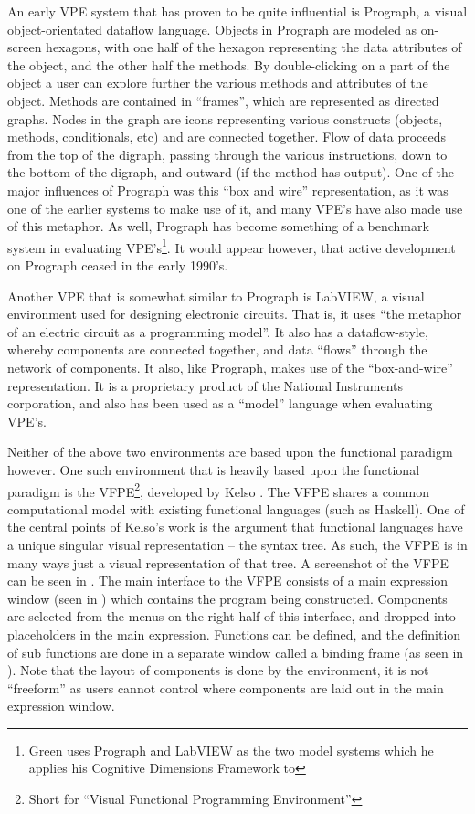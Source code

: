 An early VPE system that has proven to be quite influential is Prograph, a visual object-orientated dataflow language.  Objects in Prograph are modeled as on-screen hexagons, with one half of the hexagon representing the data attributes of the object, and the other half the methods.  By double-clicking on a part of the object a user can explore further the various methods and attributes of the object.  Methods are contained in ``frames'', which are represented as directed graphs.  Nodes in the graph are icons representing various constructs (objects, methods, conditionals, etc) and are connected together.  Flow of data proceeds from the top of the digraph, passing through the various instructions, down to the bottom of the digraph, and outward (if the method has output).  One of the major influences of Prograph was this ``box and wire'' representation, as it was one of the earlier systems to make use of it, and many VPE's have also made use of this metaphor.  As well, Prograph has become something of a benchmark system in evaluating VPE's\footnote{Green uses Prograph and LabVIEW as the two model systems which he applies his Cognitive Dimensions Framework to}.  It would appear however, that active development on Prograph ceased in the early 1990's.

Another VPE that is somewhat similar to Prograph is LabVIEW\cite{labview}, a visual environment used for designing electronic circuits.  That is, it uses ``the metaphor of an electric circuit as a programming model''\cite{Kelso02}.  It also has a dataflow-style, whereby components are connected together, and data ``flows'' through the network of components.  It also, like Prograph, makes use of the ``box-and-wire'' representation.  It is a proprietary product of the National Instruments corporation, and also has been used as a ``model'' language when evaluating VPE's.

Neither of the above two environments are based upon the functional paradigm however.  One such environment that is heavily based upon the functional paradigm is the VFPE\footnote{Short for ``Visual Functional Programming Environment''}, developed by Kelso \cite{Kelso02}.  The VFPE shares a common computational model with existing functional languages (such as Haskell).  One of the central points of Kelso's work is the argument that functional languages have a unique singular visual representation -- the syntax tree.  As such, the VFPE is in many ways just a visual representation of that tree.  A screenshot of the VFPE can be seen in .  The main interface to the VFPE consists of a main expression window (seen in ) which contains the program being constructed.  Components are selected from the menus on the right half of this interface, and dropped into placeholders in the main expression.  Functions can be defined, and the definition of sub functions are done in a separate window called a binding frame (as seen in ).  Note that the layout of components is done by the environment, it is not ``freeform'' as users cannot control where components are laid out in the main expression window.


